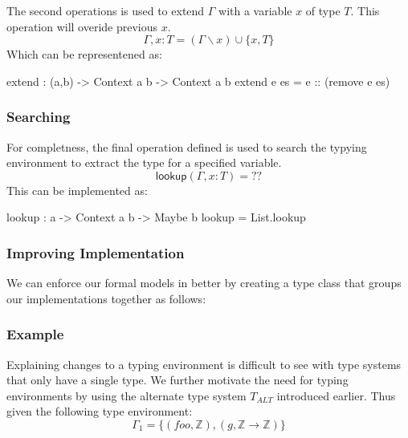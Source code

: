 The second operations is used to extend $\Gamma$ with a variable $x$ of type $T$.
This operation will overide previous $x$.
\[
\Gamma,x:T = (\Gamma\backslash x)\cup\{x,T\}
\]
\noindent
Which can be representened as:
\begin{code}
extend : (a,b) -> Context a b -> Context a b
extend e es = e :: (remove e es)
\end{code}

\subsubsection{Searching}
\label{sec:type:env-operations:lookup}

For completness, the final operation defined is used to search the typying environment to extract the type for a specified variable.
\[
\mathsf{lookup}(\Gamma,x:T) = \text{??}
\]
\noindent
This can be implemented as:
\begin{code}
lookup : a -> Context a b -> Maybe b
lookup = List.lookup
\end{code}

\subsubsection{Improving \idris{} Implementation}
\label{sec:type:env-operations:classes}

We can enforce our formal models in \idris{} better by creating a type class that groups our implementations together as follows:

\subsubsection{Example}
\label{sec:types:example}

Explaining changes to a typing environment is difficult to see with type systems that only have a single type.
We further motivate the need for typing environments by using the alternate type system $T_{ALT}$ introduced earlier.
Thus given the following type environment:
\[
\Gamma_{1}=\{(foo,\mathbb{Z}),(g,\mathbb{Z}\rightarrow\mathbb{Z})\}
\]

